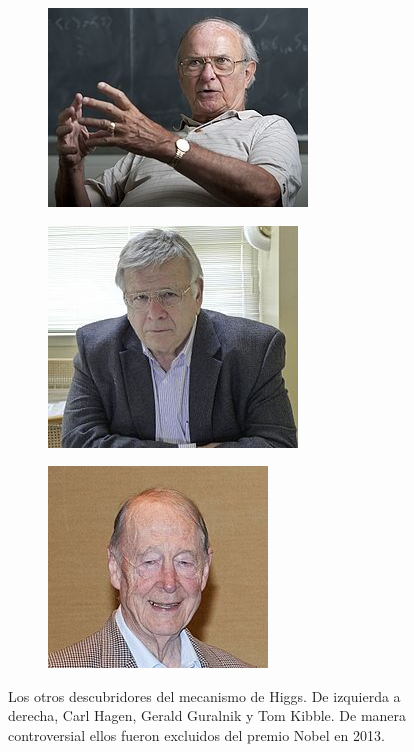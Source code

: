 \documentclass[12pt,a4paper]{report}
\begin{document}
\begin{figure}
\begin{subfigure}{0.3\textwidth}
	\includegraphics[scale=2]{images/hagen.jpg}
\end{subfigure}	
\begin{subfigure}{0.3\textwidth}
	\includegraphics[scale=0.5]{images/guralnik.jpg}
\end{subfigure}	
\begin{subfigure}{0.3\textwidth}
	\includegraphics[scale=0.5]{images/kibble.jpg}
\end{subfigure}	

	\caption{Los otros descubridores del mecanismo de Higgs. De izquierda a derecha, Carl Hagen, Gerald Guralnik y Tom Kibble. De manera controversial ellos fueron excluidos del premio Nobel en 2013.} 
\end{figure}
\end{document}
